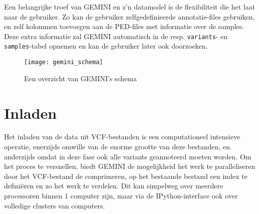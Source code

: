 Een belangrijke troef van GEMINI en z'n datamodel is de flexibiliteit die het laat naar de gebruiker. Zo kan de gebruiker zelfgedefinieerde annotatie-files gebruiken, en zelf kolommen toevoegen aan de PED-files met informatie over de samples. Deze extra informatie zal GEMINI automatisch in de resp. \texttt{variants}- en \texttt{samples}-tabel opnemen en kan de gebruiker later ook doorzoeken.

\begin{figure}[h]
\texttt{[image: gemini\_schema]}
\caption{Een overzicht van GEMINI's schema}
\label{gemini_schema_pic}
\end{figure}

\section{Inladen}
Het inladen van de data uit VCF-bestanden is een computationeel intensieve operatie, enerzijds omwille van de enorme grootte van deze bestanden, en anderzijds omdat in deze fase ook alle variants geannoteerd moeten worden. Om het proces te versnellen, biedt GEMINI de mogelijkheid het werk te paralleliseren door het VCF-bestand de comprimeren, op het bestaande bestand een index te defini\"eren en zo het werk te verdelen. Dit kan simpelweg over meerdere processoren binnen 1 computer zijn, maar via de IPython-interface ook over volledige clusters van computers.\\


